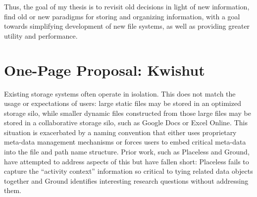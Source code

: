 Thus, the goal of my thesis is to revisit old decisions in light of new
information, find old or new paradigms for storing and organizing information,
with a goal towards simplifying development of new file systems, as well as
providing greater utility and performance.


\section{One-Page Proposal: Kwishut}
\label{ch:appendix:section:kwishut}

Existing storage systems often operate in isolation.
This does not match the
usage or expectations of users: large static files may be stored in an optimized
storage silo, while smaller dynamic files constructed from those large files may
be stored in a collaborative storage silo, such as Google Docs or Excel Online.
This situation is exacerbated by a naming convention that either uses
proprietary meta-data management mechanisms or forces users to embed critical
meta-data into the file and path name structure.  Prior work, such as Placeless
and Ground, have attempted to address aspects of this but have fallen short:
Placeless fails to capture the “activity context” information so critical to
tying related data objects together and Ground identifies interesting research
questions without addressing them.

